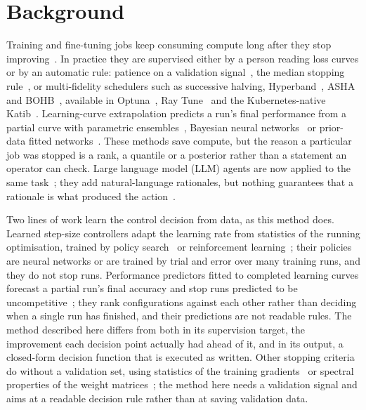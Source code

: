\section*{Background}
Training and fine-tuning jobs keep consuming compute long after they stop improving~\cite{schwartz2020greenai}. In practice they are supervised either by a person reading loss curves or by an automatic rule: patience on a validation signal~\cite{prechelt2012early}, the median stopping rule~\cite{golovin2017vizier}, or multi-fidelity schedulers such as successive halving, Hyperband~\cite{li2018hyperband}, ASHA~\cite{li2020asha} and BOHB~\cite{falkner2018bohb}, available in Optuna~\cite{akiba2019optuna}, Ray Tune~\cite{liaw2018tune} and the Kubernetes-native Katib~\cite{george2020katib}. Learning-curve extrapolation predicts a run's final performance from a partial curve with parametric ensembles~\cite{domhan2015extrapolation}, Bayesian neural networks~\cite{klein2017lcnet} or prior-data fitted networks~\cite{adriaensen2023lcpfn}. These methods save compute, but the reason a particular job was stopped is a rank, a quantile or a posterior rather than a statement an operator can check. Large language model (LLM) agents are now applied to the same task~\cite{zhang2023llmhpo,liu2024agenthpo,huang2024mlagentbench,chan2025mlebench}; they add natural-language rationales, but nothing guarantees that a rationale is what produced the action~\cite{yao2023react}.

Two lines of work learn the control decision from data, as this method does. Learned step-size controllers adapt the learning rate from statistics of the running optimisation, trained by policy search~\cite{daniel2016stepsize} or reinforcement learning~\cite{xu2019adaptivelr}; their policies are neural networks or are trained by trial and error over many training runs, and they do not stop runs. Performance predictors fitted to completed learning curves forecast a partial run's final accuracy and stop runs predicted to be uncompetitive~\cite{baker2017performance,swersky2014freezethaw}; they rank configurations against each other rather than deciding when a single run has finished, and their predictions are not readable rules. The method described here differs from both in its supervision target, the improvement each decision point actually had ahead of it, and in its output, a closed-form decision function that is executed as written. Other stopping criteria do without a validation set, using statistics of the training gradients~\cite{mahsereci2017noval} or spectral properties of the weight matrices~\cite{martin2021rmt}; the method here needs a validation signal and aims at a readable decision rule rather than at saving validation data.

